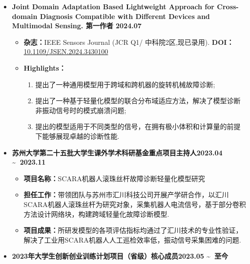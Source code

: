 \documentclass[UTF8,AutoFakeBold]{resume}
\begin{document}
\begin{itemize}
    \sloppy{}
    \item
    {\large\kaishu\textbf{Joint Domain Adaptation Based Lightweight Approach for Cross-domain Diagnosis Compatible with Different Devices and Multimodal Sensing. \hspace{2.5cm} 第一作者\hspace{3cm} 2024.07 }}

    \begin{itemize}[nolistsep]
        \setlength{\leftmargin}{-2pt}
        \item[\faThumbTack] \kaishu \textbf{杂志：}IEEE Sensors Journal (JCR Q1/ 中科院2区,现已录用). \quad 
        \textbf{DOI：}\href{https://doi.org/10.1109/JSEN.2024.3430100}{10.1109/JSEN.2024.3430100}
        \item[\faThumbTack] \textbf{Highlights：}
            \begin{enumerate}
                \item 提出了一种通用模型用于跨域和跨机器的旋转机械故障诊断;
                \item 提出了一种基于轻量化模型的联合分布域适应方法，解决了模型诊断非振动信号时的模式崩溃问题;
                \item 提出的模型适用于不同类型的信号，在拥有极小体积和计算量的前提下能够展现卓越的诊断性能.
            \end{enumerate}
    \end{itemize}
    
    \item
    {\large\kaishu\textbf{苏州大学第二十五批大学生课外学术科研基金重点项目\hspace{1.2cm}主持人\hspace{1.5cm}2023.04 \textasciitilde \ 2023.11}}
    \begin{itemize}
        \item[\faThumbTack] \kaishu \textbf{项目名称：}SCARA机器人滚珠丝杆故障诊断轻量化模型研究
        \item[\faThumbTack] \kaishu \textbf{担任工作：}带领团队与苏州市汇川科技公司开展产学研合作，以汇川SCARA机器人滚珠丝杆为研究对象，采集机器人电流信号，基于部分卷积方法设计网络块，构建跨域轻量化故障诊断模型.
        \item[\faThumbTack] \kaishu \textbf{项目成果：}所研发模型的各项评估指标均通过了汇川技术的专业性验证，解决了工业用SCARA机器人人工巡检效率低，振动信号采集困难的问题.
    \end{itemize}

    \item 
    {\large\kaishu\textbf{2023年大学生创新创业训练计划项目（省级）\hspace{2.8cm}核心成员\hspace{1.8cm}2023.05 \textasciitilde \ 至今}}


\end{itemize}
\end{document}
